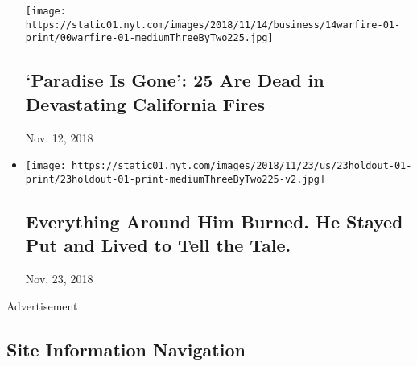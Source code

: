 \begin{itemize}
  \texttt{[image: https://static01.nyt.com/images/2018/11/14/business/14warfire-01-print/00warfire-01-mediumThreeByTwo225.jpg]}

  \hypertarget{paradise-is-gone-25-are-dead-in-devastating-california-fires}{%
  \subsection{`Paradise Is Gone': 25 Are Dead in Devastating California
  Fires}\label{paradise-is-gone-25-are-dead-in-devastating-california-fires}}

  Nov. 12, 2018
\item
  \href{https://www.nytimes.com/2018/11/22/us/survivors-california-wildfires.html}{}

  \texttt{[image: https://static01.nyt.com/images/2018/11/23/us/23holdout-01-print/23holdout-01-print-mediumThreeByTwo225-v2.jpg]}

  \hypertarget{everything-around-him-burned-he-stayed-put-and-lived-to-tell-the-tale}{%
  \subsection{Everything Around Him Burned. He Stayed Put and Lived to
  Tell the
  Tale.}\label{everything-around-him-burned-he-stayed-put-and-lived-to-tell-the-tale}}

  Nov. 23, 2018
\end{itemize}

Advertisement

\hypertarget{site-information-navigation}{%
\subsection{Site Information
Navigation}\label{site-information-navigation}}

